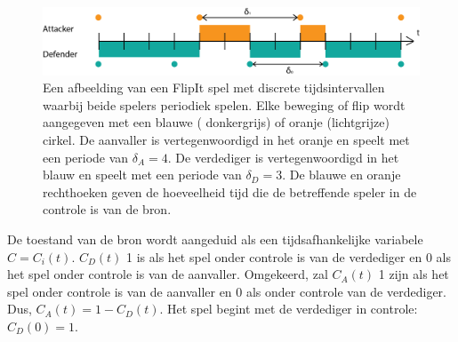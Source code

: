 \documentclass[master=cws, masteroption=vs,english]{kulemt}
\begin{document}
\begin{abstract*}
\begin{figure}[hbtp]
\center
\includegraphics[scale=0.5]{../../doc/template/Images/DefFlipit}
\caption{Een afbeelding van een FlipIt spel met discrete tijdsintervallen waarbij beide spelers periodiek spelen. Elke beweging of flip wordt aangegeven met een blauwe ( donkergrijs) of oranje (lichtgrijze) cirkel. De aanvaller is vertegenwoordigd in het oranje en speelt met een periode van $ \delta_{A} = 4 $. De verdediger is vertegenwoordigd in het blauw en speelt met een periode van $ \delta_{D} = 3 $. De blauwe en oranje rechthoeken geven de hoeveelheid tijd die de betreffende speler in de controle is van de bron.}
\label{fig: FLipItDefault}
\end{figure}



De toestand van de bron wordt aangeduid als een tijdsafhankelijke variabele $ C = C_{i}(t) $.
$ C_{D}(t) $ 1 is als het spel onder controle is van de verdediger en 0 als het spel onder controle is van de aanvaller. Omgekeerd, zal $ C_{A}(t) $ 1 zijn als het spel onder controle is van de aanvaller en 0 als onder controle van de verdediger. Dus, $ C_{A}(t) = 1 - C_{D}(t) $.
Het spel begint met de verdediger in controle: $ C_{D}(0) = 1 $. \\



\end{abstract*}
\end{document}
